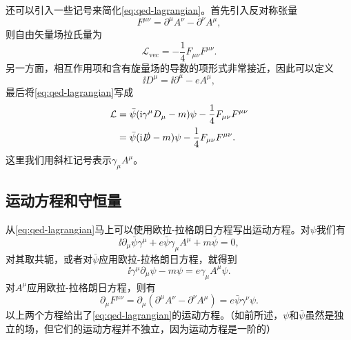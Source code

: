 还可以引入一些记号来简化\eqref{eq:qed-lagrangian}。首先引入反对称张量
\begin{equation}
    F^{\mu \nu} = \partial^\mu A^\nu - \partial^\nu A^\mu,
\end{equation}
则自由矢量场拉氏量为
\[
    \mathcal{L}_\text{vec} = - \frac{1}{4} F_{\mu \nu} F^{\mu \nu}.
\]
另一方面，相互作用项和含有旋量场的导数的项形式非常接近，因此可以定义
\begin{equation}
    \ii D^\mu = \ii \partial^\mu - e A^\mu,
\end{equation}
最后将\eqref{eq:qed-lagrangian}写成
\begin{equation}
    \begin{aligned}
        \mathcal{L} &= \bar{\psi} (\mathrm{i} \gamma^\mu D_\mu - m) \psi - \frac{1}{4} F_{\mu \nu} F^{\mu \nu} \\
        &= \bar{\psi} (\mathrm{i} \slashed{D} - m) \psi - \frac{1}{4} F_{\mu \nu} F^{\mu \nu}. 
    \end{aligned}
    \label{eq:short-qed-lagrangian}
\end{equation}
这里我们用斜杠记号表示$\gamma_\mu A^\mu$。

\subsection{运动方程和守恒量}\label{sec:four-eqs}

从\eqref{eq:qed-lagrangian}马上可以使用欧拉-拉格朗日方程写出运动方程。对$\psi$我们有
\[
    \ii \partial_\mu \bar{\psi} \gamma^\mu + e \bar{\psi} \gamma_\mu A^\mu + m \bar{\psi} = 0,
\]
对其取共轭，或者对$\bar{\psi}$应用欧拉-拉格朗日方程，就得到
\begin{equation}
    \ii \gamma^\mu \partial_\mu \psi - m \psi = e \gamma_\mu A^\mu \psi.
    \label{eq:movement-eq-1}
\end{equation}
对$A^\mu$应用欧拉-拉格朗日方程，则有
\begin{equation}
    \partial_\mu F^{\mu \nu} = \partial_\mu (\partial^\mu A^\nu - \partial^\nu A^\mu) = e \bar{\psi} \gamma^\nu \psi.
    \label{eq:movement-eq-2}
\end{equation}
以上两个方程给出了\eqref{eq:qed-lagrangian}的运动方程。（如前所述，$\psi$和$\bar{\psi}$虽然是独立的场，但它们的运动方程并不独立，因为运动方程是一阶的）

